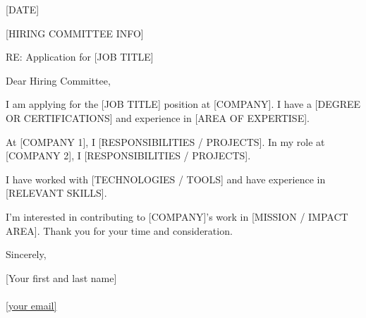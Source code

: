 \documentclass[11pt]{article}
\begin{document}
\pagestyle{empty}
[DATE]

[HIRING COMMITTEE INFO]

RE: Application for [JOB TITLE]

Dear Hiring Committee,

I am applying for the [JOB TITLE] position at [COMPANY]. I have a [DEGREE OR CERTIFICATIONS] and experience in [AREA OF EXPERTISE].

At [COMPANY 1], I [RESPONSIBILITIES / PROJECTS].  
In my role at [COMPANY 2], I [RESPONSIBILITIES / PROJECTS].

I have worked with [TECHNOLOGIES / TOOLS] and have experience in [RELEVANT SKILLS].

I'm interested in contributing to [COMPANY]'s work in [MISSION / IMPACT AREA].  
Thank you for your time and consideration.

Sincerely,

[Your first and last name] \\
[phone number] \\
\href{mailto:[your email]}{[your email]}
\end{document}
